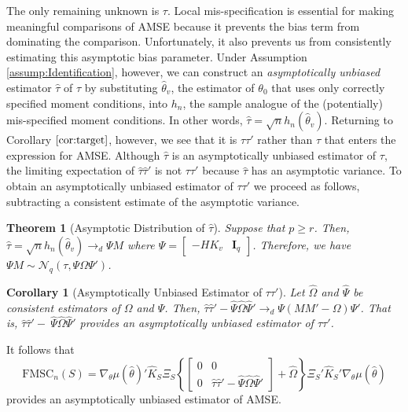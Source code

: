 \documentclass[12pt]{article}
\newtheorem{thm}{Theorem}[section]
\newtheorem{cor}{Corollary}[section]
\theoremstyle{definition}
\begin{document}
The only remaining unknown is $\tau$. Local mis-specification is essential for making meaningful comparisons of AMSE because it prevents the bias term from dominating the comparison. Unfortunately, it also prevents us from consistently estimating this asymptotic bias parameter. Under Assumption \ref{assump:Identification}, however, we can construct an \emph{asymptotically unbiased} estimator $\widehat{\tau}$ of $\tau$ by substituting $\widehat{\theta}_v$, the estimator of $\theta_0$ that uses only correctly specified moment conditions, into $h_n$, the sample analogue of the (potentially) mis-specified moment conditions. In other words,  $\widehat{\tau} = \sqrt{n} h_n(\widehat{\theta}_v)$. Returning to Corollary $\ref{cor:target}$, however, we see that it is $\tau \tau'$ rather than $\tau$ that enters the expression for AMSE. Although $\widehat{\tau}$ is an asymptotically unbiased estimator of $\tau$, the limiting expectation of $\widehat{\tau} \widehat{\tau}'$ is not $\tau\tau'$ because $\widehat{\tau}$ has an asymptotic variance.  To obtain an asymptotically unbiased estimator of $\tau\tau'$ we proceed as follows, subtracting a consistent estimate of the asymptotic variance.

\begin{thm}[Asymptotic Distribution of $\widehat{\tau}$] 
\label{pro:tau}
Suppose that $p\geq r$. Then, $\widehat{\tau} = \sqrt{n} h_n(\widehat{\theta}_v) \rightarrow_d\Psi M$ where $\Psi = \left[\begin{array}{cc} -HK_v & \mathbf{I}_q \end{array}\right]$. Therefore, we have $\Psi M \sim \mathcal{N}_q(\tau, \Psi \Omega \Psi')$.
\end{thm}

\begin{cor}[Asymptotically Unbiased Estimator of $\tau \tau'$]
\label{cor:tautau}
Let $\widehat{\Omega}$ and $\widehat{\Psi}$ be consistent estimators of $\Omega$ and $\Psi$. Then, $ \widehat{\tau}\widehat{\tau}' - \widehat{\Psi}\widehat{\Omega}\widehat{\Psi}' \rightarrow_d\Psi \left(MM' - \Omega\right)\Psi' $. That is, $\widehat{\tau}\widehat{\tau}' - \ \widehat{\Psi}\widehat{\Omega}\widehat{\Psi}' $ provides an asymptotically unbiased estimator of $\tau\tau'$.
\end{cor}
It follows that
\begin{equation}
\label{eq:fmsc}
	\mbox{FMSC}_n(S) = \nabla_\theta\mu(\widehat{\theta})'\widehat{K}_S\Xi_S \left\{\left[\begin{array}{cc}0&0\\0&\widehat{\tau}\widehat{\tau}' - \widehat{\Psi}\widehat{\Omega}\widehat{\Psi}'\end{array}\right] + \widehat{\Omega}\right\}\Xi_S'\widehat{K}_S' \nabla_\theta\mu(\widehat{\theta})
\end{equation}
provides an asymptotically unbiased estimator of AMSE.
\end{document}
